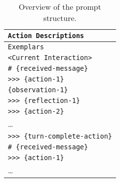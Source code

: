 \begin{table}[h!]
\centering
\small 
\begin{tabular}{l}
\toprule
\texttt{Action Descriptions} \\
\midrule
\texttt{Exemplars}  \\
\midrule
\texttt{<Current Interaction>} \\
\verb|# {received-message}| \\
\verb|>>> {action-1}| \\
\verb|{observation-1}| \\
\verb|>>> {reflection-1}| \\
\verb|>>> {action-2}| \\
\ldots \\
\verb|>>> {turn-complete-action}| \\
\verb|# {received-message}| \\
\verb|>>> {action-1}| \\
\ldots \\
\hline
\end{tabular}
\caption{Overview of the prompt structure.}
\label{tab:prompt}
\end{table}
